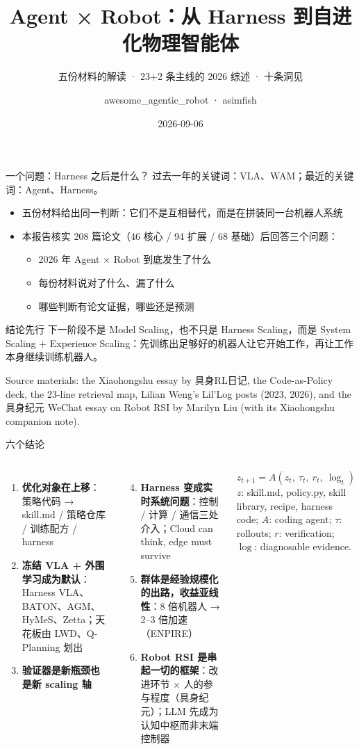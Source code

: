 \documentclass[aspectratio=169,10pt]{beamer}
\title[Agent × Robot]{Agent × Robot：从 Harness 到自进化物理智能体}
\subtitle{五份材料的解读 · 23+2 条主线的 2026 综述 · 十条洞见}
\author{awesome\_agentic\_robot · asimfish}
\institute{github.com/asimfish/awesome\_agentic\_robot}
\date{2026-09-06}
\newcommand{\HL}[1]{\textcolor{emphasis}{#1}}
\newcommand{\en}[1]{{\footnotesize\textcolor{neutral}{#1}}}
\begin{document}
\begin{frame}
\titlepage
\end{frame}

\begin{frame}{一个问题：Harness 之后是什么？}
过去一年的关键词：VLA、WAM；最近的关键词：Agent、Harness。
\begin{itemize}
  \item 五份材料给出同一判断：它们不是互相替代，而是在拼装同一台机器人系统
  \item 本报告核实 208 篇论文（46 核心 / 94 扩展 / 68 基础）后回答三个问题：
  \begin{itemize}
    \item 2026 年 Agent × Robot 到底发生了什么
    \item 每份材料说对了什么、漏了什么
    \item 哪些判断有论文证据，哪些还是预测
  \end{itemize}
\end{itemize}
\begin{block}{结论先行}
下一阶段不是 Model Scaling，也不只是 Harness Scaling，而是 \HL{System Scaling + Experience Scaling}：先训练出足够好的机器人让它开始工作，再让工作本身继续训练机器人。
\end{block}
\en{Source materials: the Xiaohongshu essay by 具身RL日记, the Code-as-Policy deck, the 23-line retrieval map, Lilian Weng's Lil'Log posts (2023, 2026), and the 具身纪元 WeChat essay on Robot RSI by Marilyn Liu (with its Xiaohongshu companion note).}
\end{frame}

\begin{frame}{六个结论}
\begin{columns}[T]
\begin{enumerate}
  \item \textbf{优化对象在上移}：策略代码 → skill.md / 策略仓库 / 训练配方 / harness
  \item \textbf{冻结 VLA + 外围学习成为默认}：Harness VLA、BATON、AGM、HyMeS、Zetta；天花板由 LWD、Q-Planning 划出
  \item \textbf{验证器是新瓶颈也是新 scaling 轴}
\end{enumerate}
\begin{enumerate}
  \setcounter{enumi}{3}
  \item \textbf{Harness 变成实时系统问题}：控制 / 计算 / 通信三处介入；Cloud can think, edge must survive
  \item \textbf{群体是经验规模化的出路，收益亚线性}：8 倍机器人 → 2--3 倍加速（ENPIRE）
  \item \textbf{Robot RSI 是串起一切的框架}：改进环节 × 人的参与程度（具身纪元）；LLM 先成为认知中枢而非末端控制器
\end{enumerate}
\vspace{2pt}
\[ z_{t+1} = A(z_t,\ \tau_t,\ r_t,\ \log_t) \]
\en{$z$: skill.md, policy.py, skill library, recipe, harness code; $A$: coding agent; $\tau$: rollouts; $r$: verification; $\log$: diagnosable evidence.}
\end{columns}
\end{frame}
\end{document}
